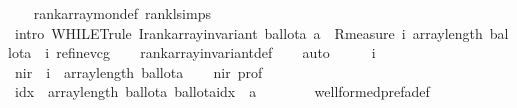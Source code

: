 \begin{isabellebody}
%
\isadelimproof
\ \ %
\endisadelimproof
%
\isatagproof
{}\isamarkupfalse%
\ rank{\isacharunderscore}{\kern0pt}array{\isacharunderscore}{\kern0pt}mon{\isacharunderscore}{\kern0pt}def\ rank{\isacharunderscore}{\kern0pt}l{\isachardot}{\kern0pt}simps\isanewline
\ \ \isamarkupfalse%
\ {\isacharparenleft}{\kern0pt}intro\ WHILET{\isacharunderscore}{\kern0pt}rule{\isacharbrackleft}{\kern0pt}\ I{\isacharequal}{\kern0pt}{\isachardoublequoteopen}{\isacharparenleft}{\kern0pt}rank{\isacharunderscore}{\kern0pt}array{\isacharunderscore}{\kern0pt}invariant\ ballot{\isacharunderscore}{\kern0pt}a\ a{\isacharparenright}{\kern0pt}{\isachardoublequoteclose}\ \ R{\isacharequal}{\kern0pt}{\isachardoublequoteopen}measure\ {\isacharparenleft}{\kern0pt}{\isasymlambda}{\isacharparenleft}{\kern0pt}i{\isacharcomma}{\kern0pt}{\isacharunderscore}{\kern0pt}{\isacharparenright}{\kern0pt}{\isachardot}{\kern0pt}\ {\isacharparenleft}{\kern0pt}array{\isacharunderscore}{\kern0pt}length\ ballot{\isacharunderscore}{\kern0pt}a{\isacharparenright}{\kern0pt}\ {\isacharminus}{\kern0pt}\ i{\isacharparenright}{\kern0pt}{\isachardoublequoteclose}{\isacharbrackright}{\kern0pt}\ refine{\isacharunderscore}{\kern0pt}vcg{\isacharparenright}{\kern0pt}\isanewline
\ \ \isamarkupfalse%
\ rank{\isacharunderscore}{\kern0pt}array{\isacharunderscore}{\kern0pt}invariant{\isacharunderscore}{\kern0pt}def\isanewline
\ \ \isamarkupfalse%
\ auto\isanewline
{}\isamarkupfalse%
\ {\isacharminus}{\kern0pt}\isanewline
\ \ \isamarkupfalse%
\ i\isanewline
\ \ \isamarkupfalse%
\ nir{\isacharcolon}{\kern0pt}\ {\isachardoublequoteopen}{\isasymnot}\ i\ {\isacharless}{\kern0pt}\ array{\isacharunderscore}{\kern0pt}length\ ballot{\isacharunderscore}{\kern0pt}a{\isachardoublequoteclose}\isanewline
\ \ \isamarkupfalse%
\ nir\ prof\ \isamarkupfalse%
\ {\isachardoublequoteopen}{\isasymforall}idx\ {\isacharless}{\kern0pt}\ array{\isacharunderscore}{\kern0pt}length\ ballot{\isacharunderscore}{\kern0pt}a{\isachardot}{\kern0pt}\ ballot{\isacharunderscore}{\kern0pt}a{\isacharbrackleft}{\kern0pt}{\isacharbrackleft}{\kern0pt}idx{\isacharbrackright}{\kern0pt}{\isacharbrackright}{\kern0pt}\ {\isasymnoteq}\ a\ {\isachardoublequoteclose}\ \isanewline
\ \ \ \ \isamarkupfalse%
\ well{\isacharunderscore}{\kern0pt}formed{\isacharunderscore}{\kern0pt}prefa{\isacharunderscore}{\kern0pt}def\ \isanewline
\ \ \ \ \ \isanewline
\ \ \isamarkupfalse%

\end{isabellebody}
